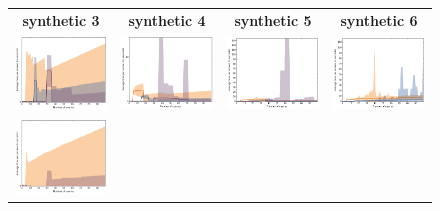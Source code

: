 \documentclass{article}
\renewcommand\[{\begin{equation}}
\renewcommand\]{\end{equation}}
\begin{document}
\begin{figure}[b]
    \centering
    \begin{tabular}{cccc}
        {\bf synthetic 3} & {\bf synthetic 4} & {\bf synthetic 5} & {\bf synthetic 6}
        \\
        \includegraphics[width=12em]{figures/synthetic_3_uniform_cv1_time} &
        \includegraphics[width=12em]{figures/synthetic_4_uniform_cv1_time} &
        \includegraphics[width=12em]{figures/synthetic_5_uniform_cv1_time} &
        \includegraphics[width=12em]{figures/synthetic_6_uniform_cv1_time}
        \\
        \includegraphics[width=12em]{figures/synthetic_3_uniform_sparse_cv1_time} &

\end{tabular}
\end{figure}
\end{document}
